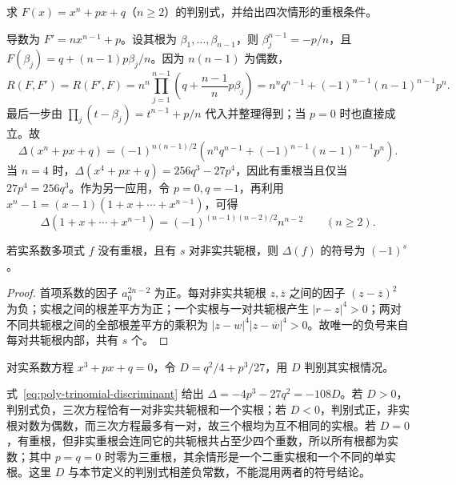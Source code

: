 \begin{example}
\label{ex:poly-trinomial-discriminant}
求 $F(x)=x^n+px+q$（$n\geq2$）的判别式，并给出四次情形的重根条件。
\end{example}
\begin{solve}
导数为 $F'=nx^{n-1}+p$。设其根为 $\beta_1,\ldots,\beta_{n-1}$，则 $\beta_j^{n-1}=-p/n$，且 $F(\beta_j)=q+(n-1)p\beta_j/n$。因为 $n(n-1)$ 为偶数，
\[
    R(F,F')=R(F',F)
    =n^n\prod_{j=1}^{n-1}\left(q+\frac{n-1}{n}p\beta_j\right)
    =n^nq^{n-1}+(-1)^{n-1}(n-1)^{n-1}p^n.
\]
最后一步由 $\prod_j(t-\beta_j)=t^{n-1}+p/n$ 代入并整理得到；当 $p=0$ 时也直接成立。故
\begin{equation}
\label{eq:poly-trinomial-discriminant}
    \Delta(x^n+px+q)=(-1)^{n(n-1)/2}
    \left(n^nq^{n-1}+(-1)^{n-1}(n-1)^{n-1}p^n\right).
\end{equation}
当 $n=4$ 时，$\Delta(x^4+px+q)=256q^3-27p^4$，因此有重根当且仅当 $27p^4=256q^3$。作为另一应用，令 $p=0,q=-1$，再利用 $x^n-1=(x-1)(1+x+\cdots+x^{n-1})$，可得
\[
    \Delta(1+x+\cdots+x^{n-1})
    =(-1)^{(n-1)(n-2)/2}n^{n-2}\qquad(n\geq2).
\]
\end{solve}

\begin{proposition}[实多项式判别式的符号]
\label{prop:poly-real-discriminant-sign}
若实系数多项式 $f$ 没有重根，且有 $s$ 对非实共轭根，则 $\Delta(f)$ 的符号为 $(-1)^s$。
\end{proposition}
\begin{proof}
首项系数的因子 $a_0^{2n-2}$ 为正。每对非实共轭根 $z,\overline z$ 之间的因子 $(z-\overline z)^2$ 为负；实根之间的根差平方为正；一个实根与一对共轭根产生 $|r-z|^4>0$；两对不同共轭根之间的全部根差平方的乘积为 $|z-w|^4|z-\overline w|^4>0$。故唯一的负号来自每对共轭根内部，共有 $s$ 个。
\end{proof}

\begin{example}
\label{ex:poly-real-cubic-discriminant}
对实系数方程 $x^3+px+q=0$，令 $D=q^2/4+p^3/27$，用 $D$ 判别其实根情况。
\end{example}
\begin{solve}
式~\eqref{eq:poly-trinomial-discriminant} 给出 $\Delta=-4p^3-27q^2=-108D$。若 $D>0$，判别式负，三次方程恰有一对非实共轭根和一个实根；若 $D<0$，判别式正，非实根对数为偶数，而三次方程最多有一对，故三个根均为互不相同的实根。若 $D=0$，有重根，但非实重根会连同它的共轭根共占至少四个重数，所以所有根都为实数；其中 $p=q=0$ 时零为三重根，其余情形是一个二重实根和一个不同的单实根。这里 $D$ 与本节定义的判别式相差负常数，不能混用两者的符号结论。
\end{solve}

